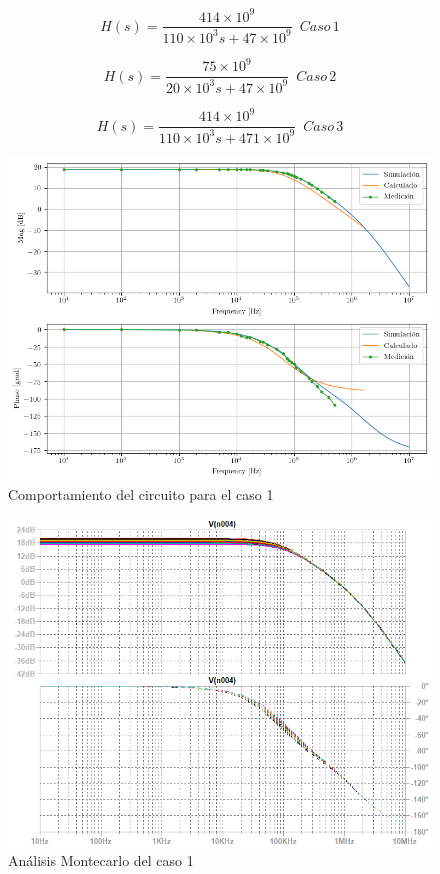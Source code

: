 \[
H(s)=\frac{414\times10^{9}}{110\times10^{3}s+47\times10^{9}}\,\,\,Caso\,1
\]

\[
H(s)=\frac{75\times10^{9}}{20\times10^{3}s+47\times10^{9}}\,\,\,Caso\,2
\]

\[
H(s)=\frac{414\times10^{9}}{110\times10^{3}s+471\times10^{9}}\,\,\,Caso\,3
\]

\begin{figure}[H]
\begin{centering}
\includegraphics[scale=0.5]{../Ex1/iB/Resources1b/H1b}
\par\end{centering}
\caption{Comportamiento del circuito para el caso 1}
\end{figure}

\begin{figure}[H]
\begin{centering}
\includegraphics[scale=0.5]{../Ex1/iB/Resources1b/Montecarlo1}
\par\end{centering}
\caption{Análisis Montecarlo del caso 1}
\end{figure}

